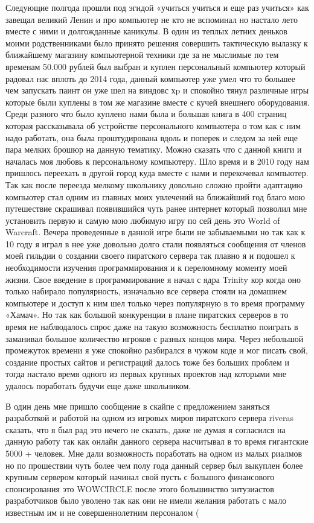 Следующие полгода прошли под эгидой «учиться учиться и еще раз учиться» как завещал великий Ленин и про компьютер не кто не вспоминал но настало лето вместе с ними и долгожданные каникулы. В один из теплых летних деньков моими родственниками было принято решения совершить тактическую вылазку к ближайшему магазину компьютерной техники где за не мыслимые по тем временам 50.000 рублей был выбран и куплен персональный компьютер который радовал нас вплоть до 2014 года, данный компьютер уже умел что то большее чем запускать паинт он уже шел на виндовс хp и спокойно тянул различные игры которые были куплены в том же магазине вместе с кучей внешнего оборудования. Среди разного что было куплено нами была и большая книга в 400 страниц которая рассказывала об устройстве персонального компьютера о том как с ним надо работать, она была проштудирована вдоль и поперек и следом за ней еще пара мелких брошюр на данную тематику. Можно сказать что с данной книги и началась моя любовь к персональному компьютеру. Шло время и в 2010 году нам пришлось переехать в другой город куда вместе с нами и перекочевал компьютер. Так как после переезда мелкому школьнику довольно сложно пройти адаптацию компьютер стал одним из главных моих увлечений на ближайший год благо мою путешествие скрашивал появившийся чуть ранее интернет который позволил мне установить первую и самую мою любимую игру по сей день это World of Warcraft. Вечера проведенные в данной игре были не забываемыми но так как к 10 году я играл в нее уже довольно долго стали появляться сообщения от членов моей гильдии о создании своего пиратского сервера так плавно я и подошел к необходимости изучения программирования и к переломному моменту моей жизни. Свое введение в программирование я начал с ядра Trinity кор когда оно только набирало популярность, изначально все сервера стояли на домашнем компьютере и доступ к ним шел только через популярную в то время программу «Хамач». Но так как большой конкуренции в плане пиратских серверов в то время не наблюдалось спрос даже на такую возможность бесплатно поиграть в заманивал большое количество игроков с разных концов мира. Через небольшой промежуток времени я уже спокойно разбирался в чужом коде и мог писать свой, создание простых сайтов и регистраций далось тоже без больших проблем и тогда настало время одного из первых крупных проектов над которыми мне удалось поработать будучи еще даже школьником.

В один день мне пришло сообщение в скайпе с предложением заняться разработкой и работой на одном из игровых миров пиратского сервера riveras сказать, что я был рад это нечего не сказать, даже не думая я согласился на данную работу так как онлайн данного сервера насчитывал в то время гигантские 5000 + человек. Мне дали возможность поработать на одном из малых риалмов но по прошествии чуть более чем полу года данный сервер был выкуплен более крупным сервером который начинал свой пусть с большого финансового спонсирования это WOWCIRCLE после этого большинство энтузиастов разработчиков было уволено так как они не имели желания работать с мало известным им и не совершеннолетним персоналом (

